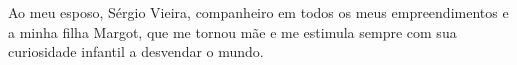 Ao meu esposo, Sérgio Vieira, companheiro em todos os meus empreendimentos e a minha filha Margot, que me tornou mãe e me estimula sempre com sua curiosidade infantil a desvendar o mundo. 